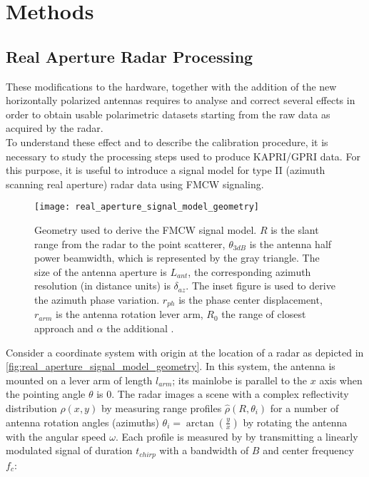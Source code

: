 \section{Methods}
\subsection{Real Aperture Radar Processing}\label{sec:mode}
These modifications to the hardware, together with the addition of the new horizontally polarized antennas requires to analyse and correct several effects in order to obtain usable polarimetric datasets starting from the raw data as acquired by the radar.\\
To understand these effect and to describe the calibration procedure, it is necessary to study the processing steps used to produce KAPRI/GPRI data. For this purpose, it is useful to introduce a signal model for type II\cite{Caduff2015} (azimuth scanning real aperture) radar data using FMCW signaling\cite{Stove1992}.
\begin{figure}[h]
	\centering
	\texttt{[image: real\_aperture\_signal\_model\_geometry]}
	\caption{Geometry used to derive the FMCW signal model. $R$ is the slant range from the radar to the point scatterer, $\theta_{3dB}$ is the antenna half power beamwidth, which is represented by the gray triangle. The size of the antenna aperture is $L_{ant}$, the corresponding azimuth resolution (in distance units) is $\delta_{az}$. The inset figure is used to derive the azimuth phase variation. $r_{ph}$ is the phase center displacement, $r_{arm}$ is the antenna rotation lever arm, $R_{0}$ the range of closest approach and $\alpha$ the additional .}
	\label{fig:real_aperture_signal_model_geometry}
\end{figure}
Consider a coordinate system with origin at the location of a radar as depicted in \autoref{fig:real_aperture_signal_model_geometry}. In this system, the antenna is mounted on a lever arm of length $l_{arm}$; its mainlobe is parallel to the $x$ axis when the pointing angle $\theta$ is 0. The radar images a scene with a complex reflectivity distribution $\rho\left(x,y\right)$ by measuring range profiles $\hat{\rho}\left(R, \theta_{i}\right)$ for a number of antenna rotation angles (azimuths) $\theta_{i} = \operatorname{arctan}\left(\frac{y}{x}\right)$ by rotating the antenna with the angular speed $\omega$. Each profile is measured by by transmitting a linearly modulated signal of duration $t_{chirp}$ with a bandwidth of $B$ and center frequency $f_c$:\\

